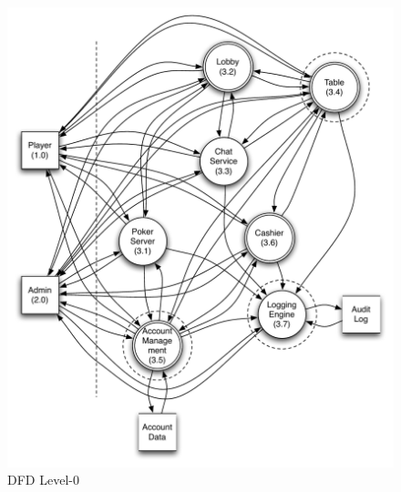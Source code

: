 \documentclass[a4paper,11pt]{report}
\begin{document}
\begin{figure}[p]
  \begin{center}
    \includegraphics[scale=0.8]{dfd_level_0}
  \end{center}
  \caption{DFD Level-0}\label{fig:level_0}
\end{figure}
\end{document}
